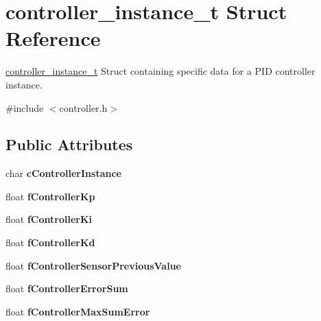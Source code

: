 \hypertarget{structcontroller__instance__t}{\section{controller\-\_\-instance\-\_\-t Struct Reference}
\label{structcontroller__instance__t}
}


\hyperlink{structcontroller__instance__t}{controller\-\_\-instance\-\_\-t} Struct containing specific data for a P\-I\-D controller instance.  




{\ttfamily \#include $<$controller.\-h$>$}

\subsection*{Public Attributes}
\begin{DoxyCompactItemize}
\item 
\hypertarget{structcontroller__instance__t_a542ee3f3788e7b8a76c27770ccf642e2}{char {\bfseries c\-Controller\-Instance}}\label{structcontroller__instance__t_a542ee3f3788e7b8a76c27770ccf642e2}

\item 
\hypertarget{structcontroller__instance__t_aa4a7cac17406d3b2c70b728e5ed2c1a1}{float {\bfseries f\-Controller\-Kp}}\label{structcontroller__instance__t_aa4a7cac17406d3b2c70b728e5ed2c1a1}

\item 
\hypertarget{structcontroller__instance__t_ac6d290c37a027fcb177e0e69e5714e38}{float {\bfseries f\-Controller\-Ki}}\label{structcontroller__instance__t_ac6d290c37a027fcb177e0e69e5714e38}

\item 
\hypertarget{structcontroller__instance__t_a486a5d3a3d070dc70140baac4faac439}{float {\bfseries f\-Controller\-Kd}}\label{structcontroller__instance__t_a486a5d3a3d070dc70140baac4faac439}

\item 
\hypertarget{structcontroller__instance__t_af0c41460a0e5572f3c640a3b8d1b27ec}{float {\bfseries f\-Controller\-Sensor\-Previous\-Value}}\label{structcontroller__instance__t_af0c41460a0e5572f3c640a3b8d1b27ec}

\item 
\hypertarget{structcontroller__instance__t_ac8d6fce60554a736e37447164109fb47}{float {\bfseries f\-Controller\-Error\-Sum}}\label{structcontroller__instance__t_ac8d6fce60554a736e37447164109fb47}

\item 
\hypertarget{structcontroller__instance__t_a1add4421d287595001560ca7e07796ff}{float {\bfseries f\-Controller\-Max\-Sum\-Error}}\label{structcontroller__instance__t_a1add4421d287595001560ca7e07796ff}

\end{DoxyCompactItemize}


